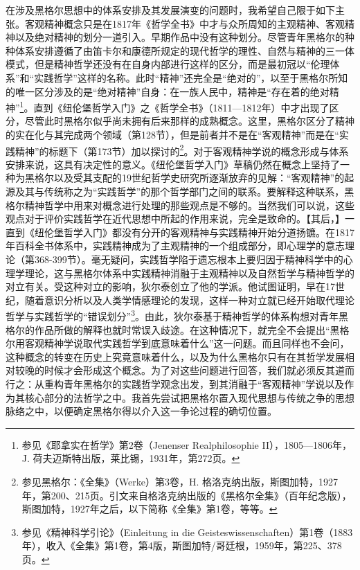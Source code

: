 在涉及黑格尔思想中的体系安排及其发展演变的问题时，我希望自己限于如下主张。客观精神概念只是在1817年《哲学全书》中才与众所周知的主观精神、客观精神以及绝对精神的划分一道引入。早期作品中没有这种划分。尽管青年黑格尔的种种体系安排遵循了由笛卡尔和康德所规定的现代哲学的理性、自然与精神的三一体模式，但是精神哲学还没有在自身内部进行这样的区分，而是最初冠以“伦理体系”和“实践哲学”这样的名称。此时“精神”还完全是“绝对的”，以至于黑格尔所知的唯一区分涉及的是“绝对精神”自身：在一族人民中，精神是“存在着的绝对精神”\footnote{参见《耶拿实在哲学》第2卷（Jenenser Realphilosophie II），1805—1806年，J. 荷夫迈斯特出版，莱比锡，1931年，第272页。}。直到《纽伦堡哲学入门》之《哲学全书》（1811—1812年）中才出现了区分，尽管此时黑格尔似乎尚未拥有后来那样的成熟概念。这里，黑格尔区分了精神的实在化与其完成两个领域（第128节），但是前者并不是在“客观精神”而是在“实践精神”的标题下（第173节）加以探讨的\footnote{参见黑格尔：《全集》（Werke）第3卷，H. 格洛克纳出版，斯图加特，1927年，第200、215页。引文来自格洛克纳出版的《黑格尔全集》（百年纪念版），斯图加特，1927年之后，以下简称《全集》第1卷，等等。}。对于客观精神学说的概念形成与体系安排来说，这具有决定性的意义。《纽伦堡哲学入门》草稿仍然在概念上坚持了一种为黑格尔以及受其支配的19世纪哲学史研究所逐渐放弃的见解：“客观精神”的起源及其与传统称之为“实践哲学”的那个哲学部门之间的联系。要解释这种联系，黑格尔精神哲学中用来对概念进行处理的那些观点是不够的。当然我们可以说，这些观点对于评价实践哲学在近代思想中所起的作用来说，完全是致命的。【其后，】一直到《纽伦堡哲学入门》都没有分开的客观精神与实践精神开始分道扬镳。在1817年百科全书体系中，实践精神成为了主观精神的一个组成部分，即心理学的意志理论（第368-399节）。毫无疑问，实践哲学陷于遗忘根本上要归因于精神科学中的心理学理论，这与黑格尔体系中实践精神消融于主观精神以及自然哲学与精神哲学的对立有关。受这种对立的影响，狄尔泰创立了他的学派。他试图证明，早在17世纪，随着意识分析以及人类学情感理论的发现，这样一种对立就已经开始取代理论哲学与实践哲学的“错误划分”\footnote{参见《精神科学引论》（Einleitung in die Geisteswissenschaften）第1卷（1883年），收入《全集》第1卷，第4版，斯图加特/哥廷根，1959年，第225、378页。}。由此，狄尔泰基于精神哲学的体系构想对青年黑格尔的作品所做的解释也就时常误入歧途。在这种情况下，就完全不会提出“黑格尔用客观精神学说取代实践哲学到底意味着什么”这一问题。而且同样也不会问，这种概念的转变在历史上究竟意味着什么，以及为什么黑格尔只有在其哲学发展相对较晚的时候才会形成这个概念。为了对这些问题进行回答，我们就必须反其道而行之：从重构青年黑格尔的实践哲学观念出发，到其消融于“客观精神”学说以及作为其核心部分的法哲学之中。我首先尝试把黑格尔置入现代思想与传统之争的思想脉络之中，以便确定黑格尔得以介入这一争论过程的确切位置。

